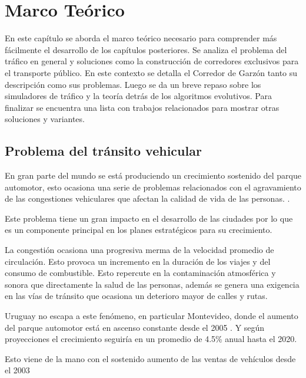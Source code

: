 \chapter{Marco Teórico}

 En este capítulo se aborda el marco teórico necesario para comprender más fácilmente el desarrollo de los capítulos posteriores. Se analiza el problema del tráfico en general y soluciones como la construcción de corredores exclusivos para el transporte público. En este contexto se detalla el Corredor de Garzón tanto su descripción como sus problemas. Luego se da un breve repaso sobre los simuladores de tráfico y la teoría detrás de los algoritmos evolutivos. Para finalizar se encuentra una lista con trabajos relacionados para mostrar otras soluciones y variantes.

\section{Problema del tránsito vehicular}

En gran parte del mundo se está produciendo un crecimiento sostenido del parque automotor, esto ocasiona una serie de problemas relacionados con el agravamiento de las congestiones vehiculares que afectan la calidad de vida de las personas.  \citep{Cepal2003}.

Este problema tiene un gran impacto en el desarrollo de las ciudades por lo que es un componente principal en los planes estratégicos para su crecimiento.

La congestión ocasiona una progresiva merma de la velocidad promedio de circulación. Esto provoca un incremento en la duración de los viajes y del consumo de combustible. Esto repercute en la contaminación atmosférica y sonora que directamente la salud de las personas, además se genera una exigencia en las vías de tránsito que ocasiona un deterioro mayor de calles y rutas.

Uruguay no escapa a este fenómeno, en particular Montevideo, donde el aumento del parque automotor está en ascenso constante desde el 2005 \citep{INE2014}.
Y según proyecciones el crecimiento seguiría en un promedio de 4.5\% anual hasta el 2020. \citep{BBVA2013}

Esto viene de la mano con el sostenido aumento de las ventas de vehículos  desde el 2003 \citep{Autoanuario2014}

